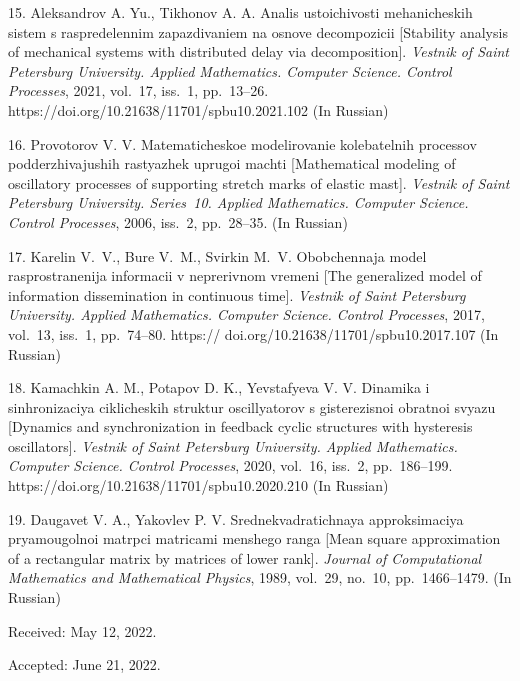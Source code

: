 {15. Aleksandrov A. Yu., Tikhonov A. A. Analis ustoichivosti mehanicheskih sistem s raspredelennim zapazdivaniem na osnove decompozicii  [Stability analysis of mechanical systems with distributed delay via decomposition]. \emph{Vestnik of Saint Petersburg University. Applied Mathematics. Computer Science. Control Processes}, 2021, vol.~17, iss.~1, pp.~13--26. %
https://doi.org/10.21638/11701/spbu10.2021.102 (In Russian)

16. Provotorov V. V.  Matematicheskoe modelirovanie kolebatelnih processov podderzhivajushih rastyazhek uprugoi machti [Mathematical modeling of oscillatory processes of supporting stretch marks of elastic mast]. \emph{Vestnik of Saint Petersburg University. Se\-ries~10. Applied Mathematics. Computer Science. Control Processes}, 2006, iss.~2, pp.~28--35.   (In Russian)

17. Karelin V.~V., Bure V.~M., Svirkin M.~V. Obobchennaja model rasprostranenija informacii v neprerivnom vremeni [The generalized model of information dissemination in continuous time]. \textit{Vestnik of Saint Petersburg University. Applied Mathematics. Computer Science. Control Processes}, 2017, vol.~13, iss.~1, pp.~74--80. %
https:// doi.org/10.21638/11701/spbu10.2017.107 (In Russian)

18. Kamachkin A. M., Potapov D. K., Yevstafyeva V. V.  Dinamika i sinhronizaciya ciklicheskih struktur oscillyatorov s gisterezisnoi obratnoi svyazu [Dynamics and synchronization in feedback cyclic structures with hysteresis oscillators]. \emph{Vestnik of Saint Petersburg University. Applied Mathematics. Computer Science. Control Processes}, 2020, vol.~16, iss.~2, pp.~186--199. \\
https://doi.org/10.21638/11701/spbu10.2020.210 (In Russian)

19. Daugavet V. A.,  Yakovlev P. V. Srednekvadratichnaya approksimaciya pryamougolnoi matrpci matricami menshego ranga  [Mean square approximation of a rectangular  matrix by matrices of lower rank].  \emph{Journal of Computational Mathematics and Mathematical Physics}, 1989, vol.~29, no.~10, pp.~1466--1479.  (In Russian)


\vskip 1.5mm

%


Received:  May 12,  2022.

Accepted: June 21, 2022.

}
